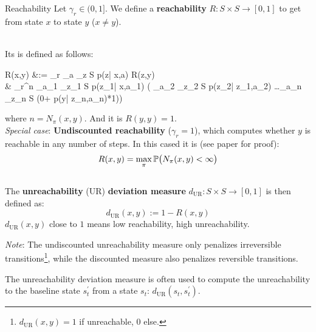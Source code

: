 \begin{Definition}{Reachability}{}{}
	Let $\gamma_r \in (0,1]$. We define a \textbf{reachability} $R:S\times S\to[0,1]$ to get from state $x$ to state $y$ ($x\neq y$).\\
	\\
	
	Its is defined as follows:
	\begin{flalign*}
		R(x,y) &:= \gamma_r \max\limits_{a} \sum_{z \in S} p(z| \; x,a) R(z,y)\\
		& \gamma_r^{n} \max\limits_{a_1} \sum_{z_1 \in S} p(z_1| \; x,a_1) \Big( \max\limits_{a_2} \sum_{z_2 \in S} p(z_2| \; z_1,a_2) \dots \max\limits_{a_{n}} \sum_{z_{n} \in S} (0+ p(y| \; z_{n},a_{n})*1)\Big)
	\end{flalign*}
	where $n=N_{\pi}(x,y)$. And it is $R(y,y)=1$.\\
	
	\textit{Special case}: \textbf{Undiscounted reachability} ($\gamma_r=1$), which computes whether $y$ is reachable in any number of steps. In this cased it is (see paper for proof):
	\[ R(x,y) = \max_\pi \mathbb{P}\big( N_{\pi}(x,y)<\infty \big) \]
	\\
	
	The \textbf{unreachability} (UR) \textbf{deviation measure} $d_{\text{UR}}:S\times S\to[0,1]$ is then defined as:
	\[ d_{\text{UR}}(x,y) := 1-R(x,y) \]
	$d_{\text{UR}}(x,y)$ close to $1$ means low reachability, high unreachability.
	
	\textit{Note}: The undiscounted unreachability measure only penalizes irreversible transitions\footnote{$d_{\text{UR}}(x,y)=1$ if unreachable, $0$ else.}, while the
	discounted measure also penalizes reversible transitions.
\end{Definition}

The unreachability deviation measure is often used to compute the unreachability to the baseline state $s^\prime_t$ from a state $s_t$: $d_{\text{UR}}(s_t,s^\prime_t)$.


